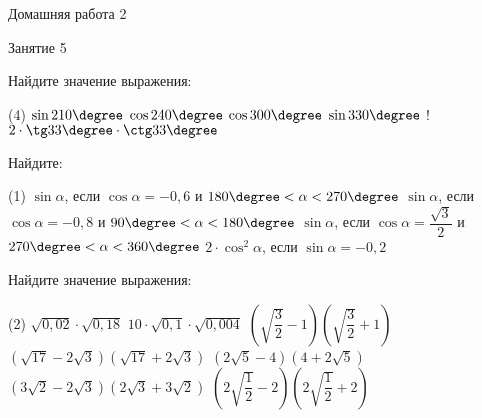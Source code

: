 \begin{homework}[number=2]
	\begin{listofex}
		\item Домашняя работа 2
	\end{listofex}
\end{homework}

\begin{class}[number=5]
	\begin{listofex}
		\item Занятие 5
	\end{listofex}
\end{class}

\begin{class}[number=6]
	\begin{listofex}
		\item Найдите значение выражения:
		\begin{tasks}(4)
			\task \( \sin210\degree \)
			\task \( \cos240\degree \)
			\task \( \cos300\degree \)
			\task \( \sin330\degree \)
			\task! \( 2\cdot\tg33\degree\cdot\ctg33\degree \)
		\end{tasks}
		\item Найдите:
		\begin{tasks}(1)
			\task \( \sin\alpha \), если \( \cos\alpha=-0,6 \) и \( 180\degree<\alpha<270\degree \)
			\task \( \sin\alpha \), если \( \cos\alpha=-0,8 \) и \( 90\degree<\alpha<180\degree \)
			\task \( \sin\alpha \), если \( \cos\alpha=\dfrac{\sqrt{3}}{2}\) и \( 270\degree<\alpha<360\degree \)
			\task \( 2\cdot\cos^2\alpha \), если \( \sin\alpha=-0,2 \)
		\end{tasks}
		\item Найдите значение выражения:
		\begin{tasks}(2)
			\task \( \sqrt{0,02}\cdot\sqrt{0,18} \)
			\task \( 10\cdot\sqrt{0,1}\cdot\sqrt{0,004} \)	
			\task \( \left( \sqrt{\dfrac{3}{2}}-1 \right)\left( \sqrt{\dfrac{3}{2}}+1 \right) \)
			\task \( (\sqrt{17}-2\sqrt{3})(\sqrt{17}+2\sqrt{3}) \)
			\task \( (2\sqrt{5}-4)(4+2\sqrt{5}) \)
			\task \( (3\sqrt{2}-2\sqrt{3})(2\sqrt{3}+3\sqrt{2}) \)
			\task \( \left( 2\sqrt{\dfrac{1}{2}}-2 \right)\left( 2\sqrt{\dfrac{1}{2}}+2 \right) \)
		\end{tasks}
	\end{listofex}
\end{class}

